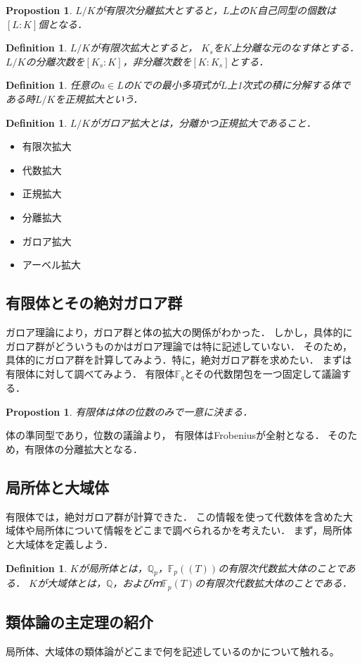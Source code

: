 \documentclass{ujarticle}
\newtheorem{dfn}[thm]{Definition}
\newtheorem{prop}[thm]{Propostion}
\begin{document}
\begin{prop}
   $L/K$が有限次分離拡大とすると，$L$上の$K$自己同型の個数は$[L:K]$個となる．
\end{prop}

\begin{dfn}
  $L/K$が有限次拡大とすると，
  $K_s$を$K$上分離な元のなす体とする．$L/K$の分離次数を$[K_s:K]$，非分離次数を$[K:K_s]$とする．
\end{dfn}


\begin{dfn}
 任意の$a \in L$の$K$での最小多項式が$L$上1次式の積に分解する体である時$L/K$を正規拡大という．
\end{dfn}


\begin{dfn}
 $L/K$がガロア拡大とは，分離かつ正規拡大であること．
\end{dfn}



\begin{itemize}
  \item 有限次拡大
  \item 代数拡大
  \item 正規拡大
  \item 分離拡大
  \item ガロア拡大
  \item アーベル拡大
\end{itemize}

\subsection{有限体とその絶対ガロア群}
\label{sub:有限体とその絶対ガロア群}
ガロア理論により，ガロア群と体の拡大の関係がわかった．
しかし，具体的にガロア群がどういうものかはガロア理論では特に記述していない．
そのため，具体的にガロア群を計算してみよう．特に，絶対ガロア群を求めたい．
まずは有限体に対して調べてみよう．
有限体$\mathbb{F}_q$とその代数閉包を一つ固定して議論する．
\begin{prop}
  有限体は体の位数のみで一意に決まる．
\end{prop}

体の準同型であり，位数の議論より，
有限体はFrobeniusが全射となる．
そのため，有限体の分離拡大となる．

\subsection{局所体と大域体}
\label{sub:局所体体}
有限体では，絶対ガロア群が計算できた．
この情報を使って代数体を含めた大域体や局所体について情報をどこまで調べられるかを考えたい．
まず，局所体と大域体を定義しよう．

\begin{dfn}
 $K$が局所体とは，$\mathbb{Q}_p$，$\mathbb{F}_p((T))$の有限次代数拡大体のことである．
 $K$が大域体とは，$\mathbb{Q}$，およびｍ$\mathbb{F}_p(T)$の有限次代数拡大体のことである．
\end{dfn}




\subsection{類体論の主定理の紹介}
\label{sub:類体論の主定理の紹介}
局所体、大域体の類体論がどこまで何を記述しているのかについて触れる。
\end{document}
